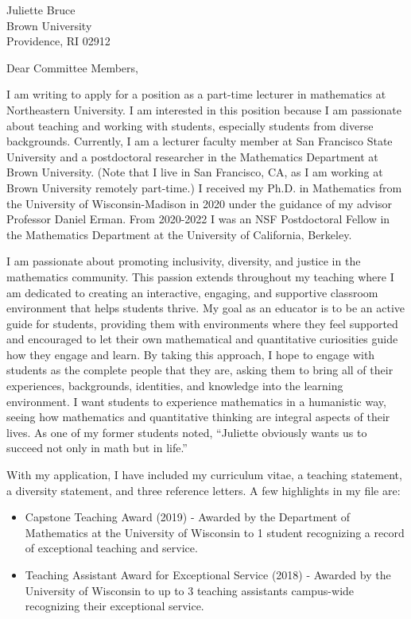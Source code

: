 \documentclass[11pt]{brownletter}
\date{November 3, 2023} %
\begin{document}
\begin{letter}{Juliette Bruce\\ 
               Brown University\\ 
               Providence, RI 02912}

\opening{Dear Committee Members,}

I am writing to apply for a position as a part-time lecturer in mathematics at Northeastern University. I am interested in this position because I am passionate about teaching and working with students, especially students from diverse backgrounds. Currently, I am a lecturer faculty member at San Francisco State University and a postdoctoral researcher in the Mathematics Department at Brown University. (Note that I live in San Francisco, CA, as I am working at Brown University remotely part-time.)  I received my Ph.D. in Mathematics from the University of Wisconsin-Madison in 2020 under the guidance of my advisor Professor Daniel Erman. From 2020-2022 I was an NSF Postdoctoral Fellow in the Mathematics Department at the University of California, Berkeley.

I am passionate about promoting inclusivity, diversity, and justice in the mathematics community. This passion extends throughout my teaching where I am dedicated to creating an interactive, engaging, and supportive classroom environment that helps students thrive. My goal as an educator is to be an active guide for students, providing them with environments where they feel supported and encouraged to let their own mathematical and quantitative curiosities guide how they engage and learn. By taking this approach, I hope to engage with students as the complete people that they are, asking them to bring all of their experiences, backgrounds, identities, and knowledge into the learning environment. I want students to experience mathematics in a humanistic way, seeing how mathematics and quantitative thinking are integral aspects of their lives. As one of my former students noted, ``Juliette obviously wants us to succeed not only in math but in life.''


With my application, I have included my curriculum vitae, a teaching statement, a diversity statement, and three reference letters. A few highlights in my file are:
\begin{itemize}

\item Capstone Teaching Award (2019) - Awarded by the Department of Mathematics at the University of Wisconsin to 1 student recognizing a record of exceptional teaching and service.
\item Teaching Assistant Award for Exceptional Service  (2018) - Awarded by the University of Wisconsin to up to 3 teaching assistants campus-wide recognizing their exceptional service.


\end{itemize}
\end{letter}
\end{document}
